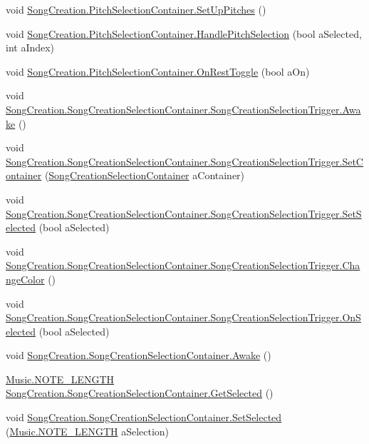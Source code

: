 \begin{DoxyCompactItemize}
\item 
void \hyperlink{group___s_c_handlers_ga77883e72bde65d22eaa2ace411fd9206}{Song\+Creation.\+Pitch\+Selection\+Container.\+Set\+Up\+Pitches} ()
\item 
void \hyperlink{group___s_c_handlers_gac87a7591bbd41276ff2ea28b7698b30c}{Song\+Creation.\+Pitch\+Selection\+Container.\+Handle\+Pitch\+Selection} (bool a\+Selected, int a\+Index)
\item 
void \hyperlink{group___s_c_handlers_ga6099b691cc9af45777cfc76f3f681efe}{Song\+Creation.\+Pitch\+Selection\+Container.\+On\+Rest\+Toggle} (bool a\+On)
\item 
void \hyperlink{group___s_c_handlers_ga1d7d3017d7cc312657926de99f04d73c}{Song\+Creation.\+Song\+Creation\+Selection\+Container.\+Song\+Creation\+Selection\+Trigger.\+Awake} ()
\item 
void \hyperlink{group___s_c_handlers_gaa9ae3234792bb4a0ee0cb16d00563130}{Song\+Creation.\+Song\+Creation\+Selection\+Container.\+Song\+Creation\+Selection\+Trigger.\+Set\+Container} (\hyperlink{class_song_creation_1_1_song_creation_selection_container}{Song\+Creation\+Selection\+Container} a\+Container)
\item 
void \hyperlink{group___s_c_handlers_ga477673c43fb3b828ed54d06d00e93f08}{Song\+Creation.\+Song\+Creation\+Selection\+Container.\+Song\+Creation\+Selection\+Trigger.\+Set\+Selected} (bool a\+Selected)
\item 
void \hyperlink{group___s_c_handlers_ga3e790d06e364f26ed6f8a78cb87bbf6d}{Song\+Creation.\+Song\+Creation\+Selection\+Container.\+Song\+Creation\+Selection\+Trigger.\+Change\+Color} ()
\item 
void \hyperlink{group___s_c_handlers_ga33e6eb8e123cb32f40c2c06149a31087}{Song\+Creation.\+Song\+Creation\+Selection\+Container.\+Song\+Creation\+Selection\+Trigger.\+On\+Selected} (bool a\+Selected)
\item 
void \hyperlink{group___s_c_handlers_ga79e6f3c7cb63cad55eb9fa99c8698012}{Song\+Creation.\+Song\+Creation\+Selection\+Container.\+Awake} ()
\item 
\hyperlink{group___music_enums_gaf11b5f079adbb21c800b9eca1c5c3cbd}{Music.\+N\+O\+T\+E\+\_\+\+L\+E\+N\+G\+TH} \hyperlink{group___s_c_handlers_gac1a7dd19ee5cf14d87a09e803432acd1}{Song\+Creation.\+Song\+Creation\+Selection\+Container.\+Get\+Selected} ()
\item 
void \hyperlink{group___s_c_handlers_ga71307336af2197a0ee20bbaf3bfb02aa}{Song\+Creation.\+Song\+Creation\+Selection\+Container.\+Set\+Selected} (\hyperlink{group___music_enums_gaf11b5f079adbb21c800b9eca1c5c3cbd}{Music.\+N\+O\+T\+E\+\_\+\+L\+E\+N\+G\+TH} a\+Selection)

\end{DoxyCompactItemize}
